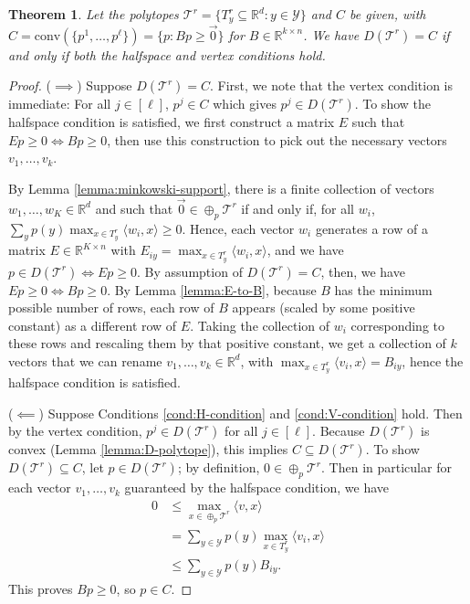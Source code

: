 \documentclass[12pt]{article}
\newcommand{\reals}{\mathbb{R}}
\newcommand{\T}{\mathcal{T}}
\newcommand{\Y}{\mathcal{Y}}
\newcommand{\inprod}[2]{\langle #1, #2 \rangle}%
\newcommand{\conv}{\mathrm{conv}}
\newtheorem{theorem}{Theorem}
\begin{document}
  \begin{theorem} \label{thm:vertex-halfspace-opt}
    Let the polytopes $\T^r = \{T^r_y \subseteq \reals^d : y \in \Y\}$ and $C$ be given, with $C = \conv(\{p^1,\ldots,p^{\ell}\}) = \{p: Bp \geq \vec 0\}$ for $B \in \reals^{k \times n}$.
    We have $D(\T^r) = C$ if and only if both the halfspace and vertex conditions hold.
  \end{theorem}
  \begin{proof}
    ($\implies$)
    Suppose $D(\T^r) = C$.
    First, we note that the vertex condition is immediate: For all $j \in [\ell]$, $p^j \in C$ which gives $p^j \in D(\T^r)$.
    To show the halfspace condition is satisfied, we first construct a matrix $E$ such that $Ep \geq 0 \iff Bp \geq 0$, then use this construction to pick out the necessary vectors $v_1,\dots,v_k$.

    By Lemma \ref{lemma:minkowski-support}, there is a finite collection of vectors $w_1,\dots,w_{K} \in \reals^d$ and such that $\vec 0 \in \oplus_p \T^r$ if and only if, for all $w_i$, $\sum_y p(y) \max_{x \in T^r_y} \inprod{w_i}{x} \geq 0$.
    Hence, each vector $w_i$ generates a row of a matrix $E \in \reals^{K \times n}$ with $E_{iy} = \max_{x \in T^r_y} \inprod{w_i}{x}$, and we have $p \in D(\T^r) \iff Ep \geq 0$.
    By assumption of $D(\T^r) = C$, then, we have $Ep \geq 0 \iff Bp \geq 0$.
    By Lemma \ref{lemma:E-to-B}, because $B$ has the minimum possible number of rows, each row of $B$ appears (scaled by some positive constant) as a different row of $E$. Taking the collection of $w_i$ corresponding to these rows and rescaling them by that positive constant, we get a collection of $k$ vectors that we can rename $v_1,\ldots,v_k \in \reals^d$, with $\max_{x \in T^r_y} \inprod{v_i}{x} = B_{iy}$, hence the halfspace condition is satisfied.

    ($\impliedby$)
    Suppose Conditions \ref{cond:H-condition} and \ref{cond:V-condition} hold.
    Then by the vertex condition, $p^j \in D(\T^r)$ for all $j \in [\ell]$.
    Because $D(\T^r)$ is convex (Lemma \ref{lemma:D-polytope}), this implies $C \subseteq D(\T^r)$.
    To show $D(\T^r) \subseteq C$, let $p \in D(\T^r)$; by definition, $0 \in \oplus_p \T^r$.
    Then in particular for each vector $v_1,\ldots,v_k$ guaranteed by the halfspace condition, we have
    \begin{align*}
      0 &\leq \max_{x \in \oplus_p \T^r} \inprod{v}{x}  \\
        &=    \sum_{y \in \Y} p(y) \max_{x \in T^r_y} \inprod{v_i}{x}  \\
        &\leq \sum_{y \in \Y} p(y) B_{iy} .
    \end{align*}
    This proves $Bp \geq 0$, so $p \in C$.
  \end{proof}
\end{document}
